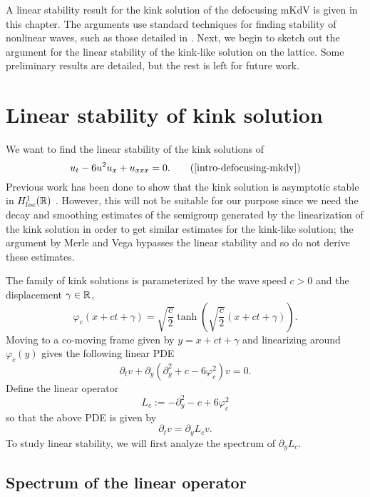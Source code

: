 A linear stability result for the kink solution of the defocusing mKdV is given in this chapter. The arguments use standard techniques for finding stability of nonlinear waves, such as those detailed in \cite{kapitula2013spectral}. Next, we begin to sketch out the argument for the linear stability of the kink-like solution on the lattice. Some preliminary results are detailed, but the rest  is left for future work.
\section{Linear stability of kink solution}


We want to find the linear stability of the kink solutions of 
\begin{equation*}
	u_t - 6u^2u_x + u_{xxx} = 0. \tag{\ref{intro-defocusing-mkdv}}
\end{equation*}
Previous work has been done to show that the kink solution is asymptotic stable in \(H^1_{loc}(\mathbb{R})\) \cite{merle20032}. However, this will not be suitable for our purpose since we need the decay and smoothing estimates of the semigroup generated by the linearization of the kink solution in order to get similar estimates for the kink-like solution; the argument by Merle and Vega bypasses the linear stability and so do not derive these estimates.

The family of kink solutions is parameterized by the wave speed \(c>0\) and the displacement \(\gamma \in \mathbb{R}\),
\begin{equation*} 
	\varphi_c(x + ct + \gamma)  = \sqrt{\frac c 2} \tanh\left(\sqrt{\frac c 2} (x +ct + \gamma) \right).
\end{equation*} 
Moving to a co-moving frame given by \(y = x+ct+\gamma\) and linearizing around \(\varphi_c(y)\) gives the following linear PDE
\begin{equation*} 
	\partial_t v + \partial_y (\partial_y^2 + c - 6 \varphi_c^2)v = 0.
\end{equation*} 
Define the linear operator
\begin{equation*} 
	L_c := -\partial_y^2 - c + 6 \varphi_c^2
\end{equation*} 
so that the above PDE is given by 
\begin{equation}\label{linear-v-eqn}
	\partial_t v = \partial_y L_c v.
\end{equation}
To study linear stability, we will first analyze the spectrum of \(\partial_y L_c\).

\subsection{Spectrum of the linear operator}

